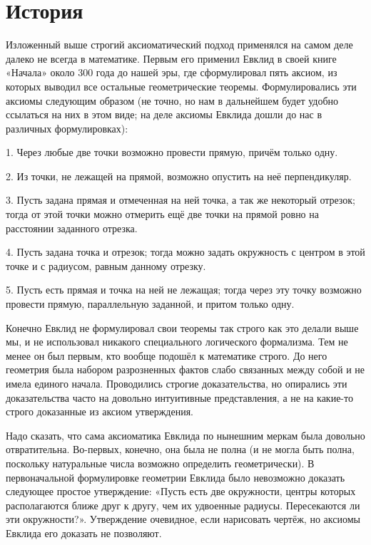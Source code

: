\section{История}

Изложенный выше строгий аксиоматический подход применялся на самом деле далеко не всегда в математике. Первым его применил Евклид в своей книге «Начала» около 300 года до нашей эры, где сформулировал пять аксиом, из которых выводил все остальные геометрические теоремы. Формулировались эти аксиомы следующим образом (не точно, но нам в дальнейшем будет удобно ссылаться на них в этом виде; на деле аксиомы Евклида дошли до нас в различных формулировках):

1. Через любые две точки возможно провести прямую, причём только одну.

2. Из точки, не лежащей на прямой, возможно опустить на неё перпендикуляр.

3. Пусть задана прямая и отмеченная на ней точка, а так же некоторый отрезок; тогда от этой точки можно отмерить ещё две точки на прямой ровно на расстоянии заданного отрезка.

4. Пусть задана точка и отрезок; тогда можно задать окружность с центром в этой точке и с радиусом, равным данному отрезку.

5. Пусть есть прямая и точка на ней не лежащая; тогда через эту точку возможно провести прямую, параллельную заданной, и притом только одну.

Конечно Евклид не формулировал свои теоремы так строго как это делали выше мы, и не использовал никакого специального логического формализма. Тем не менее он был первым, кто вообще подошёл к математике строго. До него геометрия была набором разрозненных фактов слабо связанных между собой и не имела единого начала. Проводились строгие доказательства, но опирались эти доказательства часто на довольно интуитивные представления, а не на какие-то строго доказанные из аксиом утверждения.

Надо сказать, что сама аксиоматика Евклида по нынешним меркам была довольно отвратительна. Во-первых, конечно, она была не полна (и не могла быть полна, поскольку натуральные числа возможно определить геометрически). В первоначальной формулировке геометрии Евклида было невозможно доказать следующее простое утверждение: «Пусть есть две окружности, центры которых располагаются ближе друг к другу, чем их удвоенные радиусы. Пересекаются ли эти окружности?». Утверждение очевидное, если нарисовать чертёж, но аксиомы Евклида его доказать не позволяют.

